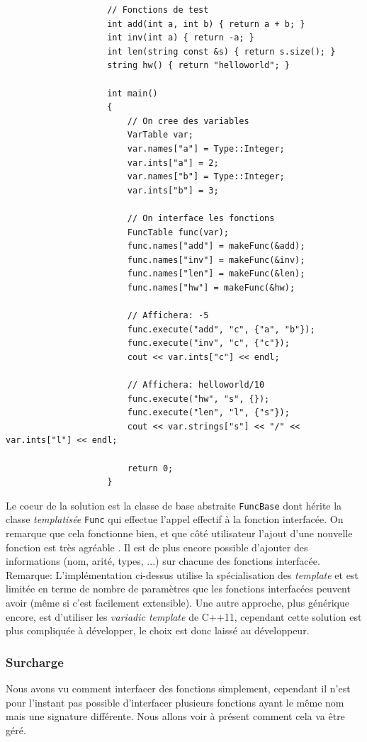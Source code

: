 \documentclass[french]{article}
\begin{document}
\begin{lstlisting}
					// Fonctions de test
					int add(int a, int b) { return a + b; }
					int inv(int a) { return -a; }
					int len(string const &s) { return s.size(); }
					string hw() { return "helloworld"; }
					
					int main()
					{
						// On cree des variables
						VarTable var;
						var.names["a"] = Type::Integer;
						var.ints["a"] = 2;
						var.names["b"] = Type::Integer;
						var.ints["b"] = 3;
						
						// On interface les fonctions
						FuncTable func(var);
						func.names["add"] = makeFunc(&add);
						func.names["inv"] = makeFunc(&inv);
						func.names["len"] = makeFunc(&len);
						func.names["hw"] = makeFunc(&hw);
						
						// Affichera: -5
						func.execute("add", "c", {"a", "b"});
						func.execute("inv", "c", {"c"});
						cout << var.ints["c"] << endl;
						
						// Affichera: helloworld/10
						func.execute("hw", "s", {});
						func.execute("len", "l", {"s"});
						cout << var.strings["s"] << "/" << var.ints["l"] << endl;
						
						return 0;
					}
		\end{lstlisting}
		
		Le coeur de la solution est la classe de base abstraite \texttt{FuncBase} dont hérite la classe \textit{templatisée} \texttt{Func} qui effectue l'appel effectif à la fonction interfacée. On remarque que cela fonctionne bien, et que côté utilisateur l'ajout d'une nouvelle fonction est très agréable . Il est de plus encore possible d'ajouter des informations (nom, arité, types, ...) sur chacune des fonctions interfacée.\\
		
		Remarque: L'implémentation ci-dessus utilise la spécialisation des \textit{template} et est limitée en terme de nombre de paramètres que les fonctions interfacées peuvent avoir (même si c'est facilement extensible). Une autre approche, plus générique encore, est d'utiliser les \textit{variadic template} de C++11, cependant cette solution est plus compliquée à développer, le choix est donc laissé au développeur.
		
		\subsubsection{Surcharge}
		Nous avons vu comment interfacer des fonctions simplement, cependant il n'est pour l'instant pas possible d'interfacer plusieurs fonctions ayant le même nom mais une signature différente. Nous allons voir à présent comment cela va être géré.\\
		
\end{document}
